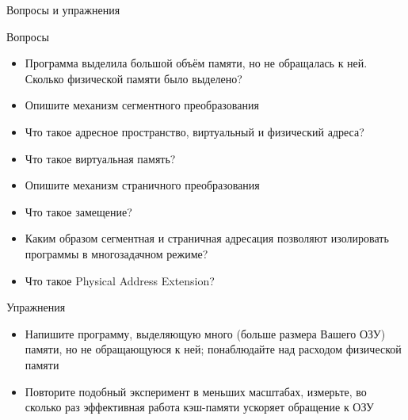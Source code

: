 \documentclass[xetex,aspectratio=43]{beamer}
\begin{document}
\begin{frame}{Вопросы и упражнения}
    \small
    \vspace{-3mm}
    \begin{block}{Вопросы}
        \begin{itemize}
            \tightlist
            \item
            Программа выделила большой объём памяти, но не обращалась к ней.
            Сколько физической памяти было выделено?
            \item
            Опишите механизм сегментного преобразования
            \item
            Что такое адресное пространство, виртуальный и физический адреса?
            \item
            Что такое виртуальная память?
            \item
            Опишите механизм страничного преобразования
            \item
            Что такое замещение?
            \item
            Каким образом сегментная и страничная адресация позволяют изолировать
            программы в многозадачном режиме?
            \item
            Что такое Physical Address Extension?
        \end{itemize}
    \end{block}
    \vspace{-3mm}
    \begin{block}{Упражнения}
        \begin{itemize}
            \tightlist
            \item
            Напишите программу, выделяющую много (больше размера Вашего ОЗУ)
            памяти, но не обращающуюся к ней; понаблюдайте над расходом физической
            памяти
            \item
            Повторите подобный эксперимент в меньших масштабах, измерьте, во
            сколько раз эффективная работа кэш-памяти ускоряет обращение к ОЗУ
        \end{itemize}
    \end{block}
\end{frame}

\postamble
\end{document}
